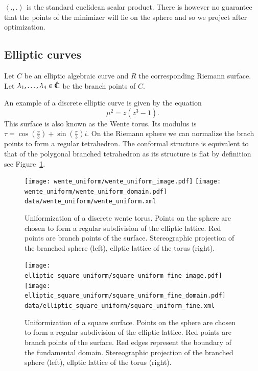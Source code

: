 \documentclass[Thesis.tex]{subfiles}
\begin{document}
$\left<.,.\right>$ is the standard euclidean scalar product. There is however no guarantee that the points of the minimizer will lie on the sphere and so we project after optimization.


\subsection{Elliptic curves}
\label{sec:examples_elliptic}

Let $C$ be an elliptic algebraic curve and $R$ the corresponding Riemann
surface. Let $\lambda_1, \ldots, \lambda_4 \in \hat{\mathbb C}$ be the branch points of
$C$. 

\begin{example}
\label{ex:wente_elliptic}
An example of a discrete elliptic curve is given by the equation
\begin{equation} \mu^2=z(z^3-1).  \end{equation} This surface is also known as
the Wente torus. Its modulus is
$\tau=\cos(\frac{\pi}{3})+\sin(\frac{\pi}{3})i$. On the Riemann sphere we can
normalize the brach points to form a regular tetrahedron. The conformal
structure is equivalent to that of the polygonal branched tetrahedron as its
structure is flat by definition see Figure~\ref{fig:wente_elliptic}.
\end{example}

\begin{figure}
\centering
\texttt{[image: wente\_uniform/wente\_uniform\_image.pdf]}
\texttt{[image: wente\_uniform/wente\_uniform\_domain.pdf]}
{\scriptsize\tt data/wente\_uniform/wente\_uniform.xml}
\caption{Uniformization of a discrete wente torus. Points on the sphere are
chosen to form a regular subdivision of the elliptic lattice. Red points are
branch points of the surface.  Stereographic projection of the branched sphere
(left), ellptic lattice of the torus (right).} \label{fig:wente_elliptic}
\end{figure}

\begin{figure}
\centering
\texttt{[image: elliptic\_square\_uniform/square\_uniform\_fine\_image.pdf]}
\texttt{[image: elliptic\_square\_uniform/square\_uniform\_fine\_domain.pdf]}
{\scriptsize\tt data/elliptic\_square\_uniform/square\_uniform\_fine.xml}
\caption{Uniformization of a square surface. Points on the sphere are chosen
to form a regular subdivision of the elliptic lattice. Red points are branch
points of the surface. Red edges represent the boundary of the fundamental
domain. Stereographic projection of the branched sphere (left), ellptic
lattice of the torus (right).} 
\label{fig:square_elliptic} 
\end{figure}	
\end{document}
